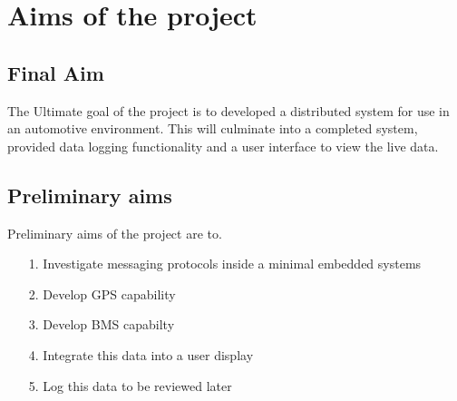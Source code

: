 
\chapter{Aims of the project} %



\section{Final Aim}

The Ultimate goal of the project is to developed a distributed system for use in an automotive environment. This will culminate into a completed system, provided data logging functionality and a user interface to view the live data. \cite{citeulike:9725737}

\section{Preliminary aims}

Preliminary aims of the project are to.

\begin{itemize}
\item[1. Investigate messaging protocols inside a minimal embedded systems]
\item[2. Develop GPS capability]
\item[3. Develop BMS capabilty]
\item[4. Integrate this data into a user display]
\item[5. Log this data to be reviewed later]
\end{itemize}



